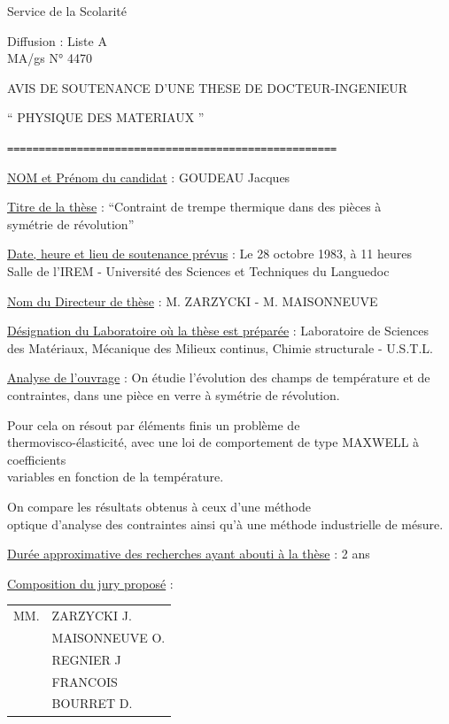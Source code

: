 Service de la Scolarité

Diffusion : Liste A\\
MA/gs \qquad N° 4470

\begin{center}
AVIS DE SOUTENANCE D'UNE THESE DE DOCTEUR-INGENIEUR

`` PHYSIQUE \quad DES MATERIAUX ''

\texttt{====================================================}
\end{center}

\uline{NOM et Prénom du candidat} : GOUDEAU Jacques

\uline{Titre de la thèse} : ``Contraint de trempe thermique dans des pièces à\\
symétrie de révolution''

\uline{Date, heure et lieu de soutenance prévus} : Le 28 octobre 1983, à 11 heures\\
Salle de l'IREM - Université des Sciences et Techniques du Languedoc

\uline{Nom du Directeur de thèse} : M. ZARZYCKI - M. MAISONNEUVE

\uline{Désignation du Laboratoire où la thèse est préparée} : Laboratoire de Sciences\\
des Matériaux, Mécanique des Milieux continus, Chimie structurale - U.S.T.L.

\uline{Analyse de l'ouvrage} : On étudie l'évolution des champs de température et de\\
contraintes, dans une pièce en verre à symétrie de révolution.

Pour cela on résout par éléments finis un problème de\\
thermovisco-élasticité, avec une loi de comportement de type MAXWELL à coefficients\\
variables en fonction de la température.

On compare les résultats obtenus à ceux d'une méthode\\
optique d'analyse des contraintes ainsi qu'à une méthode industrielle de mésure.

\uline{Durée approximative des recherches ayant abouti à la thèse} : 2 ans

\uline{Composition du jury proposé} : \begin{tabular}[t]{ll}
MM. & ZARZYCKI J.\\
& MAISONNEUVE O.\\
& REGNIER J\\
& FRANCOIS\\
& BOURRET D.
\end{tabular}

